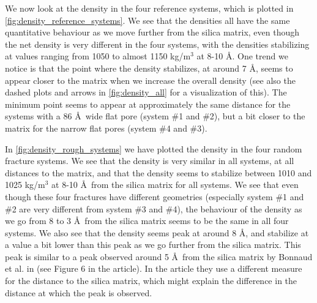 We now look at the density in the four reference systems, which is plotted in \cref{fig:density_reference_systems}. We see that the densities all have the same quantitative behaviour as we move further from the silica matrix, even though the net density is very different in the four systems, with the densities stabilizing at values ranging from 1050 to almost 1150 kg/m$^3$ at 8-10 \AA. One trend we notice is that the point where the density stabilizes, at around 7 \AA, seems to appear closer to the matrix when we increase the overall density (see also the dashed plots and arrows in \cref{fig:density_all} for a visualization of this). The minimum point seems to appear at approximately the same distance for the systems with a 86 \AA\ wide flat pore (system \#1 and \#2), but a bit closer to the matrix for the narrow flat pores (system \#4 and \#3).

In \cref{fig:density_rough_systems} we have plotted the density in the four random fracture systems. We see that the density is very similar in all systems, at all distances to the matrix, and that the density seems to stabilize between 1010 and 1025 kg/m$^3$ at 8-10 \AA\ from the silica matrix for all systems. We see that even though these four fractures have different geometries (especially system \#1 and \#2 are very different from system \#3 and \#4), the behaviour of the density as we go from 8 to 3 \AA\ from the silica matrix seems to be the same in all four systems. We also see that the density seems peak at around 8 \AA, and stabilize at a value a bit lower than this peak as we go further from the silica matrix. This peak is similar to a peak observed around 5 \AA\ from the silica matrix by Bonnaud et al. in \cite{bonnaud2010molecular} (see Figure 6 in the article). In the article they use a different measure for the distance to the silica matrix, which might explain the difference in the distance at which the peak is observed.

